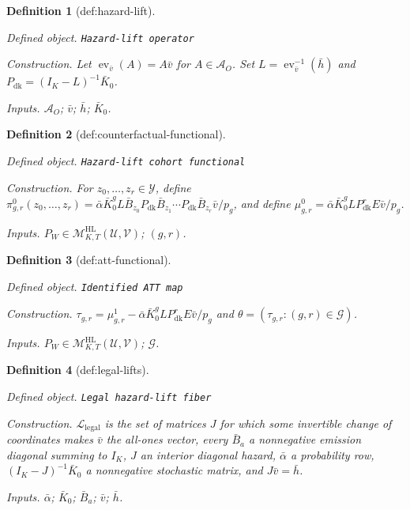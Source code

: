 \documentclass{article}
\newtheorem{definition}{Definition}
\begin{document}
\begin{definition}[def:hazard-lift]\label{def:hazard-lift}
\par\smallskip\noindent\emph{Defined object.} \texttt{Hazard-\allowbreak{}lift operator}
\par\smallskip\noindent\emph{Construction.} Let \(\operatorname{ev}_{\bar v}(A)=A\bar v\) for \(A\in\mathcal A_O\). Set \(L=\operatorname{ev}_{\bar v}^{-1}(\bar h)\) and \(P_{\mathrm{dk}}=(I_K-L)^{-1}\bar K_0\).
\par\smallskip\noindent\emph{Inputs.} \(\mathcal A_O\); \(\bar v\); \(\bar h\); \(\bar K_0\).
\end{definition}

\begin{definition}[def:counterfactual-functional]\label{def:counterfactual-functional}
\par\smallskip\noindent\emph{Defined object.} \texttt{Hazard-\allowbreak{}lift cohort functional}
\par\smallskip\noindent\emph{Construction.} For \(z_0,\ldots,z_r\in\mathcal Y\), define \(\pi^0_{g,r}(z_0,\ldots,z_r)=\bar\alpha\bar K_0^gL\bar B_{z_0}P_{\mathrm{dk}}\bar B_{z_1}\cdots P_{\mathrm{dk}}\bar B_{z_r}\bar v/p_g\), and define \(\mu^0_{g,r}=\bar\alpha\bar K_0^gLP_{\mathrm{dk}}^rE\bar v/p_g\).
\par\smallskip\noindent\emph{Inputs.} \(P_W\in\mathcal M^{\mathrm{HL}}_{K,T}(\mathcal U,\mathcal V)\); \((g,r)\).
\end{definition}

\begin{definition}[def:att-functional]\label{def:att-functional}
\par\smallskip\noindent\emph{Defined object.} \texttt{Identified ATT map}
\par\smallskip\noindent\emph{Construction.} \(\tau_{g,r}=\mu^1_{g,r}-\bar\alpha\bar K_0^gLP_{\mathrm{dk}}^rE\bar v/p_g\) and \(\theta=(\tau_{g,r}:(g,r)\in\mathcal G)\).
\par\smallskip\noindent\emph{Inputs.} \(P_W\in\mathcal M^{\mathrm{HL}}_{K,T}(\mathcal U,\mathcal V)\); \(\mathcal G\).
\end{definition}

\begin{definition}[def:legal-lifts]\label{def:legal-lifts}
\par\smallskip\noindent\emph{Defined object.} \texttt{Legal hazard-\allowbreak{}lift fiber}
\par\smallskip\noindent\emph{Construction.} \(\mathcal L_{\mathrm{legal}}\) is the set of matrices \(J\) for which some invertible change of coordinates makes \(\bar v\) the all-ones vector, every \(\bar B_a\) a nonnegative emission diagonal summing to \(I_K\), \(J\) an interior diagonal hazard, \(\bar\alpha\) a probability row, \((I_K-J)^{-1}\bar K_0\) a nonnegative stochastic matrix, and \(J\bar v=\bar h\).
\par\smallskip\noindent\emph{Inputs.} \(\bar\alpha\); \(\bar K_0\); \(\bar B_a\); \(\bar v\); \(\bar h\).
\end{definition}
\end{document}
